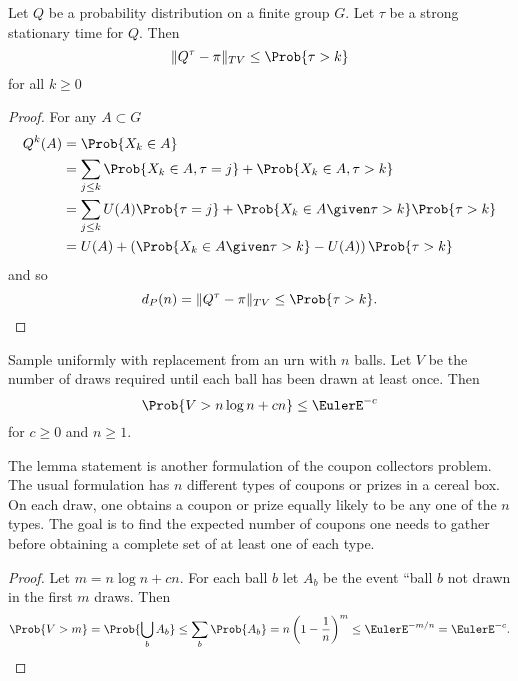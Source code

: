\documentclass[12pt]{article}
\begin{document}
\begin{lemma}
    \label{lem:cardshuffling:stoptime} Let \( Q \) be a probability
    distribution on a finite group \( G \).  Let \( \tau \) be a strong
    stationary time for \( Q \).  Then
    \[
        \| Q^{\tau} - \pi \|_{TV} \le \Prob{\tau > k}
    \] for all \( k \ge 0 \)
\end{lemma}

\begin{proof}
    For any \( A \subset G \)
    \begin{align*}
        Q^{k}(A) &= \Prob{X_k \in A} \\
        &= \sum_{j \le k} \Prob{X_k \in A, \tau = j} + \Prob{X_k \in A,
        \tau >k} \\
        &= \sum_{j \le k} U(A) \Prob{\tau = j} + \Prob{X_k \in A \given
        \tau >k} \Prob{\tau > k} \\
        &= U(A) + \left( \Prob{X_k \in A \given \tau >k} - U(A) \right)
        \Prob{\tau > k}
    \end{align*}
    and so
    \[
        d_P(n) = \| Q^{\tau} - \pi \|_{TV} \le \Prob{\tau > k}.
    \]
\end{proof}

\begin{lemma}
    \label{lem:cardshuffling:coupon} Sample uniformly with replacement
    from an urn with \( n \) balls.  Let \( V \) be the number of draws
    required until each ball has been drawn at least once.  Then
    \[
        \Prob{V > n \log n + c n} \le \EulerE^{-c}
    \] for \( c \ge 0 \) and \( n \ge 1 \).
\end{lemma}

\begin{remark}
    The lemma statement is another formulation of the coupon collectors
    problem.%
    The usual formulation has \( n \) different types of coupons or
    prizes in a cereal box.  On each draw, one obtains a coupon or prize
    equally likely to be any one of the \( n \) types.  The goal is to
    find the expected number of coupons one needs to gather before
    obtaining a complete set of at least one of each type.
\end{remark}

\begin{proof}
    Let \( m = n \log n + c n \).  For each ball \( b \) let \( A_b \)
    be the event ``ball \( b \) not drawn in the first \( m \) draws.
    Then
    \[
        \Prob{ V > m} = \Prob{ \bigcup_b A_b } \le \sum_{b} \Prob{A_b} =
        n \left( 1 - \frac{1}{n} \right)^m \le \EulerE^{-m/n} = \EulerE^
        {-c}.
    \]
\end{proof}
\end{document}
